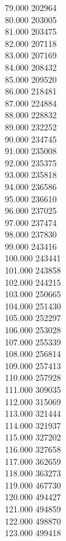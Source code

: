 { 79.000	202964 \\
 80.000	203005 \\
 81.000	203475 \\
 82.000	207118 \\
 83.000	207169 \\
 84.000	208432 \\
 85.000	209520 \\
 86.000	218481 \\
 87.000	224884 \\
 88.000	228832 \\
 89.000	232252 \\
 90.000	234745 \\
 91.000	235008 \\
 92.000	235375 \\
 93.000	235818 \\
 94.000	236586 \\
 95.000	236610 \\
 96.000	237025 \\
 97.000	237474 \\
 98.000	237830 \\
 99.000	243416 \\
 100.000	243441 \\
 101.000	243858 \\
 102.000	244215 \\
 103.000	250665 \\
 104.000	251430 \\
 105.000	252297 \\
 106.000	253028 \\
 107.000	255339 \\
 108.000	256814 \\
 109.000	257413 \\
 110.000	257928 \\
 111.000	309035 \\
 112.000	315069 \\
 113.000	321444 \\
 114.000	321937 \\
 115.000	327202 \\
 116.000	327658 \\
 117.000	362659 \\
 118.000	363273 \\
 119.000	467730 \\
 120.000	494427 \\
 121.000	494859 \\
 122.000	498870 \\
 123.000	499418 \\
}
